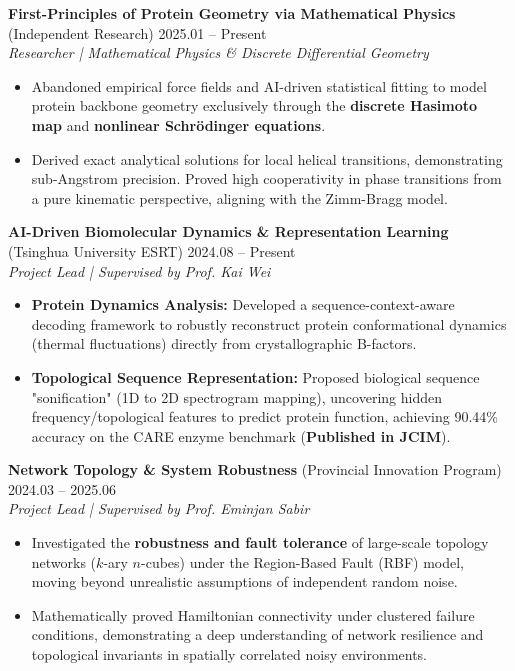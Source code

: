 \documentclass[10pt]{article}
\begin{document}
	\textbf{First-Principles of Protein Geometry via Mathematical Physics} (Independent Research) \hfill 2025.01 – Present \\
	\textit{Researcher | Mathematical Physics \& Discrete Differential Geometry}
	\begin{itemize}[noitemsep, topsep=2pt, partopsep=0pt, parsep=0pt, leftmargin=*]
		\item Abandoned empirical force fields and AI-driven statistical fitting to model protein backbone geometry exclusively through the \textbf{discrete Hasimoto map} and \textbf{nonlinear Schr\"{o}dinger equations}.
		\item Derived exact analytical solutions for local helical transitions, demonstrating sub-Angstrom precision. Proved high cooperativity in phase transitions from a pure kinematic perspective, aligning with the Zimm-Bragg model.
	\end{itemize}
	
	\vspace{2pt}
	\textbf{AI-Driven Biomolecular Dynamics \& Representation Learning} (Tsinghua University ESRT) \hfill 2024.08 – Present \\
	\textit{Project Lead | Supervised by Prof. Kai Wei}
	\begin{itemize}[noitemsep, topsep=2pt, partopsep=0pt, parsep=0pt, leftmargin=*]
		\item \textbf{Protein Dynamics Analysis:} Developed a sequence-context-aware decoding framework to robustly reconstruct protein conformational dynamics (thermal fluctuations) directly from crystallographic B-factors.
		\item \textbf{Topological Sequence Representation:} Proposed biological sequence "sonification" (1D to 2D spectrogram mapping), uncovering hidden frequency/topological features to predict protein function, achieving 90.44\% accuracy on the CARE enzyme benchmark (\textbf{Published in JCIM}).
	\end{itemize}
	
	\vspace{2pt}
	\textbf{Network Topology \& System Robustness} (Provincial Innovation Program) \hfill 2024.03 – 2025.06 \\
	\textit{Project Lead | Supervised by Prof. Eminjan Sabir}
	\begin{itemize}[noitemsep, topsep=2pt, partopsep=0pt, parsep=0pt, leftmargin=*]
		\item Investigated the \textbf{robustness and fault tolerance} of large-scale topology networks ($k$-ary $n$-cubes) under the Region-Based Fault (RBF) model, moving beyond unrealistic assumptions of independent random noise.
		\item Mathematically proved Hamiltonian connectivity under clustered failure conditions, demonstrating a deep understanding of network resilience and topological invariants in spatially correlated noisy environments.
	\end{itemize}
	
\end{document}
